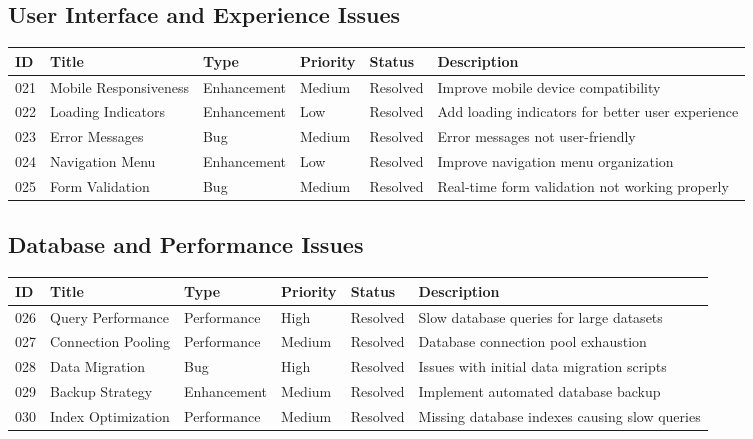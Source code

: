 \documentclass[12pt,a4paper]{article}
\begin{document}
\subsection{User Interface and Experience Issues}

\begin{longtable}{|p{0.8cm}|p{2.5cm}|p{1.5cm}|p{1.5cm}|p{1.5cm}|p{4.2cm}|}
\hline
\textbf{ID} & \textbf{Title} & \textbf{Type} & \textbf{Priority} & \textbf{Status} & \textbf{Description} \\
\hline
021 & Mobile Responsiveness & Enhancement & Medium & Resolved & Improve mobile device compatibility \\
\hline
022 & Loading Indicators & Enhancement & Low & Resolved & Add loading indicators for better user experience \\
\hline
023 & Error Messages & Bug & Medium & Resolved & Error messages not user-friendly \\
\hline
024 & Navigation Menu & Enhancement & Low & Resolved & Improve navigation menu organization \\
\hline
025 & Form Validation & Bug & Medium & Resolved & Real-time form validation not working properly \\
\hline
\end{longtable}

\subsection{Database and Performance Issues}

\begin{longtable}{|p{0.8cm}|p{2.5cm}|p{1.5cm}|p{1.5cm}|p{1.5cm}|p{4.2cm}|}
\hline
\textbf{ID} & \textbf{Title} & \textbf{Type} & \textbf{Priority} & \textbf{Status} & \textbf{Description} \\
\hline
026 & Query Performance & Performance & High & Resolved & Slow database queries for large datasets \\
\hline
027 & Connection Pooling & Performance & Medium & Resolved & Database connection pool exhaustion \\
\hline
028 & Data Migration & Bug & High & Resolved & Issues with initial data migration scripts \\
\hline
029 & Backup Strategy & Enhancement & Medium & Resolved & Implement automated database backup \\
\hline
030 & Index Optimization & Performance & Medium & Resolved & Missing database indexes causing slow queries \\
\hline
\end{longtable}
\end{document}
